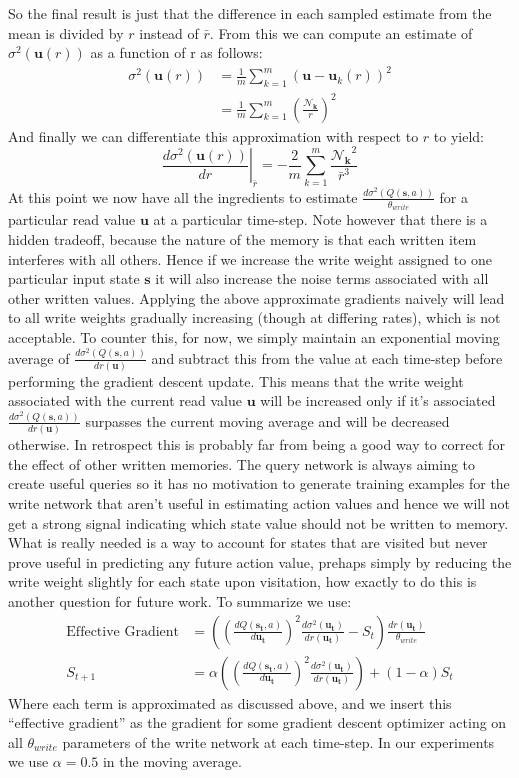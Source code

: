 \documentclass{article}
\begin{document}
So the final result is just that the difference in each sampled estimate from the mean is divided by $r$ instead of $\bar{r}$. From this we can compute an estimate of $\sigma^2(\pmb{u}(r))$ as a function of r as follows:
\begin{align*}
\sigma^2(\pmb{u}(r))&=\frac{1}{m}\sum_{k=1}^m(\pmb{u}-\pmb{u}_k(r))^2\\
&=\frac{1}{m}\sum_{k=1}^m\left(\frac{\pmb{\mathcal{N}_k}}{r}\right)^2
\end{align*}
And finally we can differentiate this approximation with respect to $r$ to yield:
$$\left.\frac{d\sigma^2(\pmb{u}(r))}{dr}\right\rvert_{\bar{r}}=-\frac{2}{m}\sum_{k=1}^m\frac{\pmb{\mathcal{N}_k}^2}{\bar{r}^3}$$
At this point we now have all the ingredients to estimate $\frac{d\sigma^2(Q(\pmb{s},a))}{\theta_{write}}$ for a particular read value $\pmb{u}$ at a particular time-step. Note however that there is a hidden tradeoff, because the nature of the memory is that each written item interferes with all others. Hence if we increase the write weight assigned to one particular input state $\pmb{s}$ it will also increase the noise terms associated with all other written values. Applying the above approximate gradients naively will lead to all write weights gradually increasing (though at differing rates), which is not acceptable. To counter this, for now, we simply maintain an exponential moving average of $\frac{d\sigma^2(Q(\pmb{s},a))}{dr(\pmb{u})}$ and subtract this from the value at each time-step before performing the gradient descent update. This means that the write weight associated with the current read value $\pmb{u}$ will be increased only if it's associated $\frac{d\sigma^2(Q(\pmb{s},a))}{dr(\pmb{u})}$ surpasses the current moving average and will be decreased otherwise. In retrospect this is probably far from being a good way to correct for the effect of other written memories. The query network is always aiming to create useful queries so it has no motivation to generate training examples for the write network that aren't useful in estimating action values and hence we will not get a strong signal indicating which state value should not be written to memory. What is really needed is a way to account for states that are visited but never prove useful in predicting any future action value, prehaps simply by reducing the write weight slightly for each state upon visitation, how exactly to do this is another question for future work. To summarize we use:
\begin{align*}
\text{Effective Gradient}&=\left(\left(\frac{dQ(\pmb{s_t},a)}{d\pmb{u_t}}\right)^2\frac{d\sigma^2(\pmb{u_t})}{dr(\pmb{u_t})}-S_t\right)\frac{dr(\pmb{u_t})}{\theta_{write}}\\
S_{t+1} &=\alpha\left(\left(\frac{dQ(\pmb{s_t},a)}{d\pmb{u_t}}\right)^2\frac{d\sigma^2(\pmb{u_t})}{dr(\pmb{u_t})}\right)+(1-\alpha)S_t
\end{align*}
Where each term is approximated as discussed above, and we insert this ``effective gradient'' as the gradient for some gradient descent optimizer acting on all $\theta_{write}$ parameters of the write network at each time-step. In our experiments we use $\alpha=0.5$ in the moving average.
\end{document}
